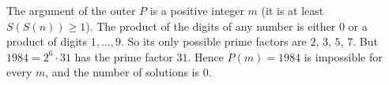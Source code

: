 The argument of the outer $P$ is a positive integer $m$ (it is at least $S(S(n))\ge1$). The product of the digits of any number is either $0$ or a product of digits $1,\dots,9$. So its only possible prime factors are $2$, $3$, $5$, $7$. But $1984=2^6\cdot31$ has the prime factor $31$. Hence $P(m)=1984$ is impossible for every $m$, and the number of solutions is $\boxed{0}$.
